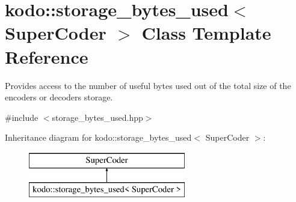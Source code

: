 \hypertarget{classkodo_1_1storage__bytes__used}{\section{kodo\-:\-:storage\-\_\-bytes\-\_\-used$<$ Super\-Coder $>$ Class Template Reference}
\label{classkodo_1_1storage__bytes__used}
}


Provides access to the number of useful bytes used out of the total size of the encoders or decoders storage.  




{\ttfamily \#include $<$storage\-\_\-bytes\-\_\-used.\-hpp$>$}

Inheritance diagram for kodo\-:\-:storage\-\_\-bytes\-\_\-used$<$ Super\-Coder $>$\-:\begin{figure}[H]
\begin{center}
\leavevmode
\includegraphics[height=2.000000cm]{classkodo_1_1storage__bytes__used}
\end{center}
\end{figure}
